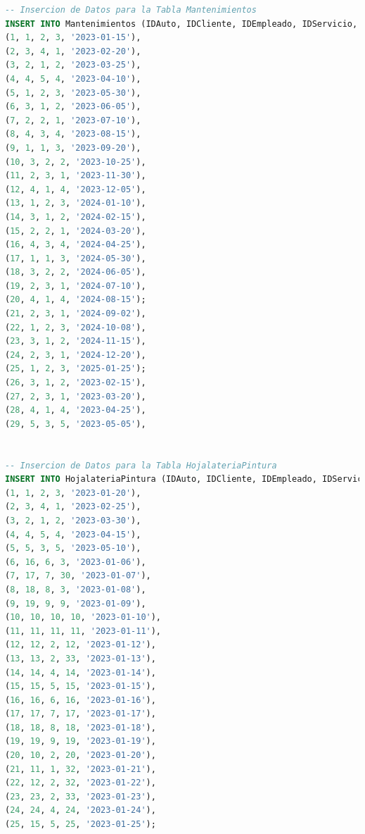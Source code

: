 \documentclass[12pt]{article}
\begin{document}
\begin{lstlisting}[language=SQL]
-- Insercion de Datos para la Tabla Mantenimientos
INSERT INTO Mantenimientos (IDAuto, IDCliente, IDEmpleado, IDServicio, FechaMantenimiento) VALUES
(1, 1, 2, 3, '2023-01-15'),
(2, 3, 4, 1, '2023-02-20'),
(3, 2, 1, 2, '2023-03-25'),
(4, 4, 5, 4, '2023-04-10'),
(5, 1, 2, 3, '2023-05-30'),
(6, 3, 1, 2, '2023-06-05'),
(7, 2, 2, 1, '2023-07-10'),
(8, 4, 3, 4, '2023-08-15'),
(9, 1, 1, 3, '2023-09-20'),
(10, 3, 2, 2, '2023-10-25'),
(11, 2, 3, 1, '2023-11-30'),
(12, 4, 1, 4, '2023-12-05'),
(13, 1, 2, 3, '2024-01-10'),
(14, 3, 1, 2, '2024-02-15'),
(15, 2, 2, 1, '2024-03-20'),
(16, 4, 3, 4, '2024-04-25'),
(17, 1, 1, 3, '2024-05-30'),
(18, 3, 2, 2, '2024-06-05'),
(19, 2, 3, 1, '2024-07-10'),
(20, 4, 1, 4, '2024-08-15');
(21, 2, 3, 1, '2024-09-02'),
(22, 1, 2, 3, '2024-10-08'),
(23, 3, 1, 2, '2024-11-15'),
(24, 2, 3, 1, '2024-12-20'),
(25, 1, 2, 3, '2025-01-25');
(26, 3, 1, 2, '2023-02-15'),
(27, 2, 3, 1, '2023-03-20'),
(28, 4, 1, 4, '2023-04-25'),
(29, 5, 3, 5, '2023-05-05'),


-- Insercion de Datos para la Tabla HojalateriaPintura
INSERT INTO HojalateriaPintura (IDAuto, IDCliente, IDEmpleado, IDServicio, FechaHojalateriaPintura) VALUES
(1, 1, 2, 3, '2023-01-20'),
(2, 3, 4, 1, '2023-02-25'),
(3, 2, 1, 2, '2023-03-30'),
(4, 4, 5, 4, '2023-04-15'),
(5, 5, 3, 5, '2023-05-10'),
(6, 16, 6, 3, '2023-01-06'),
(7, 17, 7, 30, '2023-01-07'),
(8, 18, 8, 3, '2023-01-08'),
(9, 19, 9, 9, '2023-01-09'),
(10, 10, 10, 10, '2023-01-10'),
(11, 11, 11, 11, '2023-01-11'),
(12, 12, 2, 12, '2023-01-12'),
(13, 13, 2, 33, '2023-01-13'),
(14, 14, 4, 14, '2023-01-14'),
(15, 15, 5, 15, '2023-01-15'),
(16, 16, 6, 16, '2023-01-16'),
(17, 17, 7, 17, '2023-01-17'),
(18, 18, 8, 18, '2023-01-18'),
(19, 19, 9, 19, '2023-01-19'),
(20, 10, 2, 20, '2023-01-20'),
(21, 11, 1, 32, '2023-01-21'),
(22, 12, 2, 32, '2023-01-22'),
(23, 23, 2, 33, '2023-01-23'),
(24, 24, 4, 24, '2023-01-24'),
(25, 15, 5, 25, '2023-01-25');


\end{lstlisting}
\end{document}
